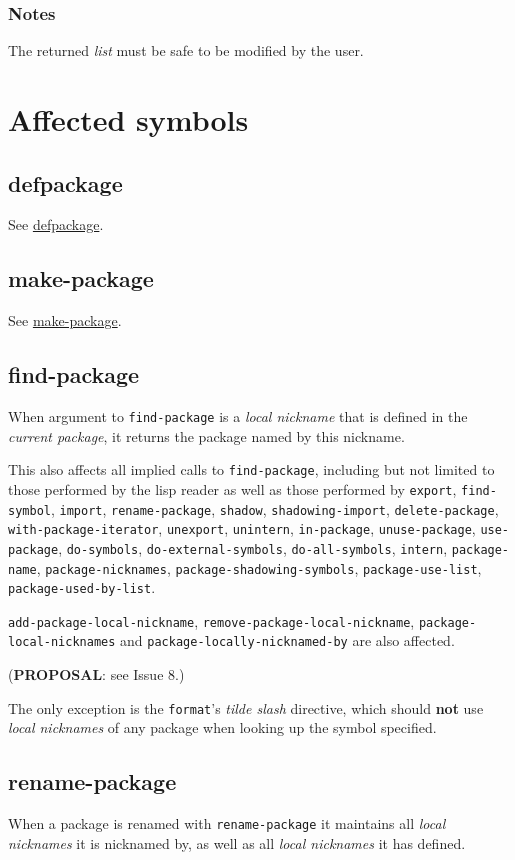 \documentclass[11pt]{article}
\begin{document}
\subsubsection{Notes}
\label{sec:orgd21002e}
The returned \emph{list} must be safe to be modified by the user.
\section{Affected symbols}
\label{sec:org1085be7}
\subsection{defpackage}
\label{sec:org4138e27}
See \hyperref[sec:orga7fab27]{defpackage}.
\subsection{make-package}
\label{sec:org318283f}
See \hyperref[sec:orgd56e37d]{make-package}.
\subsection{find-package}
\label{sec:org1442b6f}
When argument to \texttt{find-package} is a \emph{local nickname} that is defined in the
\emph{current package}, it returns the package named by this nickname.

This also affects all implied calls to \texttt{find-package}, including but not limited
to those performed by the lisp reader as well as those performed by \texttt{export},
\texttt{find-symbol}, \texttt{import}, \texttt{rename-package}, \texttt{shadow}, \texttt{shadowing-import},
\texttt{delete-package}, \texttt{with-package-iterator}, \texttt{unexport}, \texttt{unintern}, \texttt{in-package},
\texttt{unuse-package}, \texttt{use-package}, \texttt{do-symbols}, \texttt{do-external-symbols},
\texttt{do-all-symbols}, \texttt{intern}, \texttt{package-name}, \texttt{package-nicknames},
\texttt{package-shadowing-symbols}, \texttt{package-use-list}, \texttt{package-used-by-list}.

\texttt{add-package-local-nickname}, \texttt{remove-package-local-nickname},
\texttt{package-local-nicknames} and \texttt{package-locally-nicknamed-by} are also affected.

(\textbf{PROPOSAL}: see Issue 8.)

The only exception is the \texttt{format}'s \emph{tilde slash} directive, which should \textbf{not}
use \emph{local nicknames} of any package when looking up the symbol specified.
\subsection{rename-package}
\label{sec:org18f81be}
When a package is renamed with \texttt{rename-package} it maintains all \emph{local nicknames}
it is nicknamed by, as well as all \emph{local nicknames} it has defined.
\end{document}
